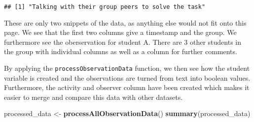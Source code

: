 \documentclass[]{article}
\newenvironment{Shaded}{\begin{snugshade}}{\end{snugshade}}
\newcommand{\KeywordTok}[1]{\textcolor[rgb]{0.13,0.29,0.53}{\textbf{{#1}}}}
\newcommand{\StringTok}[1]{\textcolor[rgb]{0.31,0.60,0.02}{{#1}}}
\newcommand{\NormalTok}[1]{{#1}}
\begin{document}
\begin{verbatim}
## [1] "Talking with their group peers to solve the task"
\end{verbatim}

These are only two snippets of the data, as anything else would not fit
onto this page. We see that the first two columns give a timestamp and
the group. We furthermore see the oberservation for student A. There are
3 other students in the group with individual columns as well as a
column for further comments.

By applying the \texttt{processObservationData} function, we then see
how the student variable is created and the observations are turned from
text into boolean values. Furthermore, the activity and observer column
have been created which makes it easier to merge and compare this data
with other datasets.

\begin{Shaded}
\begin{Highlighting}[]
\NormalTok{processed_data <-}\StringTok{ }\KeywordTok{processAllObservationData}\NormalTok{()}
\KeywordTok{summary}\NormalTok{(processed_data)}
\end{Highlighting}
\end{Shaded}
\end{document}
